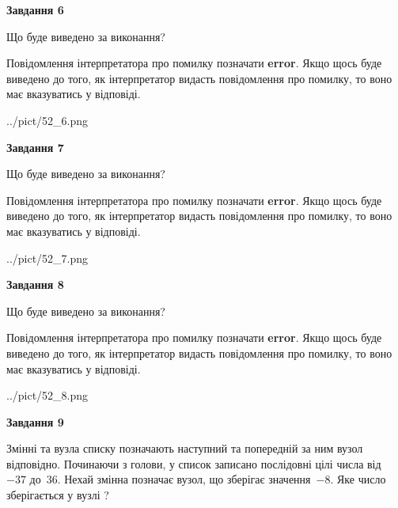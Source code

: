 \documentclass[12pt, ukrainian]{article}
\begin{document}
{\begin {large}
{\begin {center}\textbf{Завдання 6}\end {center}}\par
Що буде виведено за виконання?

Повідомлення інтерпретатора про помилку позначати \textbf{error}.
Якщо щось буде виведено до того, як інтерпретатор видасть повідомлення про помилку, 
то воно має вказуватись у відповіді. \par


\begin{center}
	{../pict/52_6.png}
\end{center}
\newpage

{\begin {center}\textbf{Завдання 7}\end {center}}\par
Що буде виведено за виконання?

Повідомлення інтерпретатора про помилку позначати \textbf{error}.
Якщо щось буде виведено до того, як інтерпретатор видасть повідомлення про помилку, 
то воно має вказуватись у відповіді. \par


\begin{center}
	{../pict/52_7.png}
\end{center}
\newpage

{\begin {center}\textbf{Завдання 8}\end {center}}\par
Що буде виведено за виконання?

Повідомлення інтерпретатора про помилку позначати \textbf{error}.
Якщо щось буде виведено до того, як інтерпретатор видасть повідомлення про помилку, 
то воно має вказуватись у відповіді. \par


\begin{center}
	{../pict/52_8.png}
\end{center}
\newpage

{\begin {center}\textbf{Завдання 9}\end {center}}\par
Змінні  та  вузла списку позначають наступний та попередній за ним вузол відповідно. Починаючи з голови, у список записано послідовні цілі числа від~$-37$ до~$36$. Нехай змінна  позначає вузол, що зберігає значення~$-8$.
Яке число зберігається у вузлі  ?\par
\newpage


\end{large}}
\end{document}
